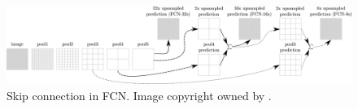 \begin{figure}[!h]
	\centering
	\includegraphics[width=\fig\textwidth]{2-06.pdf}
    \caption[Skip connection in FCN]{Skip connection in FCN. Image copyright owned by \cite{fcn}.}
    \label{fig:skipfcn}
\end{figure}